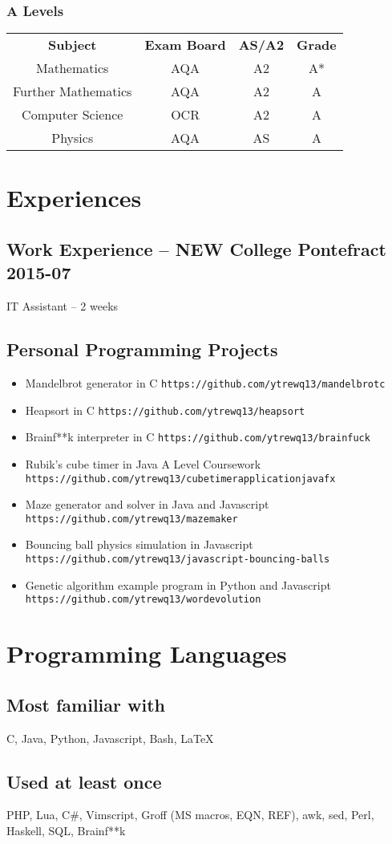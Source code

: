 \documentclass[9pt]{extarticle}
\begin{document}
    \subsubsection{A Levels}
    \begin{tabular}{cccc}
        \textbf{Subject} & \textbf{Exam Board} & \textbf{AS/A2} & \textbf{Grade} \\
        Mathematics & AQA & A2 & A* \\
        Further Mathematics & AQA & A2 & A \\
        Computer Science & OCR & A2 & A \\
        Physics & AQA & AS & A
    \end{tabular}
    \section{Experiences}
    \subsection{Work Experience -- NEW College Pontefract
    \hfill 2015-07}
    IT Assistant
    --
    2 weeks
    \subsection{Personal Programming Projects}
    \begin{itemize}
        \item Mandelbrot generator in C
            \hfill
            \texttt{https://github.com/ytrewq13/mandelbrotc}
        \item Heapsort in C
            \hfill
            \texttt{https://github.com/ytrewq13/heapsort}
        \item Brainf**k interpreter in C
            \hfill
            \texttt{https://github.com/ytrewq13/brainfuck}
        \item Rubik's cube timer in Java
            \hfill
            A Level Coursework
            \hfill
            \texttt{https://github.com/ytrewq13/cubetimerapplicationjavafx}
        \item Maze generator and solver in Java and Javascript
            \hfill
            \texttt{https://github.com/ytrewq13/mazemaker}
        \item Bouncing ball physics simulation in Javascript
            \hfill
            \texttt{https://github.com/ytrewq13/javascript-bouncing-balls}
        \item Genetic algorithm example program in Python and Javascript
            \hfill
            \texttt{https://github.com/ytrewq13/wordevolution}
    \end{itemize}
    \section{Programming Languages}
    \subsection{Most familiar with}
    C, Java, Python, Javascript, Bash, \LaTeX
    \subsection{Used at least once}
    PHP, Lua, C\#, Vimscript, Groff (MS macros, EQN, REF), awk, sed, Perl, Haskell, SQL, Brainf**k
\end{document}
